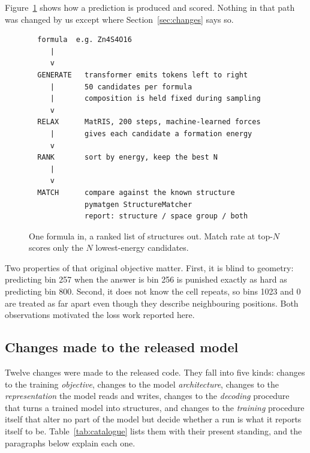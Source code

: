 \documentclass[manuscript,screen,review]{acmart}
\begin{document}
Figure~\ref{fig:pipeline} shows how a prediction is produced and scored. Nothing
in that path was changed by us except where Section~\ref{sec:changes} says so.

\begin{figure}[h]
\begin{footnotesize}
\begin{verbatim}
  formula  e.g. Zn4S4O16
     |
     v
  GENERATE   transformer emits tokens left to right
     |       50 candidates per formula
     |       composition is held fixed during sampling
     v
  RELAX      MatRIS, 200 steps, machine-learned forces
     |       gives each candidate a formation energy
     v
  RANK       sort by energy, keep the best N
     |
     v
  MATCH      compare against the known structure
             pymatgen StructureMatcher
             report: structure / space group / both
\end{verbatim}
\end{footnotesize}
\caption{One formula in, a ranked list of structures out. Match rate at top-$N$
scores only the $N$ lowest-energy candidates.}
\label{fig:pipeline}
\end{figure}

Two properties of that original objective matter. First, it is blind to
geometry: predicting bin 257 when the answer is bin 256 is punished exactly as
hard as predicting bin 800. Second, it does not know the cell repeats, so bins
1023 and 0 are treated as far apart even though they describe neighbouring
positions. Both observations motivated the loss work reported here.

\subsection{Changes made to the released model}
\label{sec:catalogue}

Twelve changes were made to the released code. They fall into five kinds:
changes to the training \emph{objective}, changes to the model
\emph{architecture}, changes to the \emph{representation} the model reads and
writes, changes to the \emph{decoding} procedure that turns a trained model into
structures, and changes to the \emph{training} procedure itself that alter no
part of the model but decide whether a run is what it reports itself to be.
Table~\ref{tab:catalogue} lists them with their present standing, and the
paragraphs below explain each one.
\end{document}
